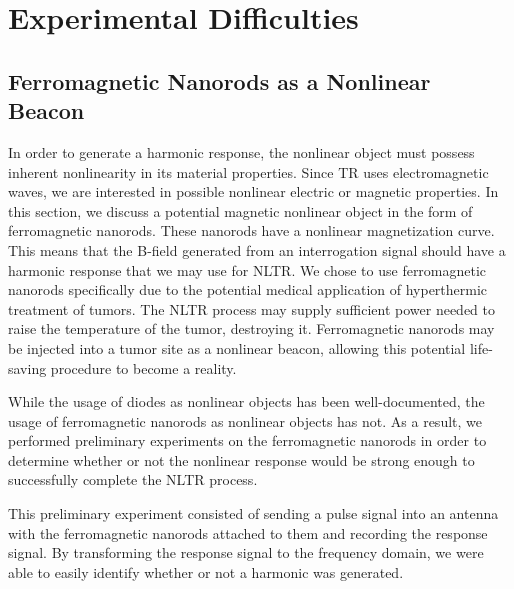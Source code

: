 \section{Experimental Difficulties}
\label{sec:nltr-expr-diff}

\subsection{Ferromagnetic Nanorods as a Nonlinear Beacon}

In order to generate a harmonic response, the nonlinear object must possess inherent nonlinearity in its material properties. Since TR uses electromagnetic waves, we are interested in possible nonlinear electric or magnetic properties. In this section, we discuss a potential magnetic nonlinear object in the form of ferromagnetic nanorods. These nanorods have a nonlinear magnetization curve. This means that the B-field generated from an interrogation signal should have a harmonic response that we may use for NLTR. We chose to use ferromagnetic nanorods specifically due to the potential medical application of hyperthermic treatment of tumors. The NLTR process may supply sufficient power needed to raise the temperature of the tumor, destroying it. Ferromagnetic nanorods may be injected into a tumor site as a nonlinear beacon, allowing this potential life-saving procedure to become a reality.

While the usage of diodes as nonlinear objects has been well-documented, the usage of ferromagnetic nanorods as nonlinear objects has not. As a result, we performed preliminary experiments on the ferromagnetic nanorods in order to determine whether or not the nonlinear response would be strong enough to successfully complete the NLTR process.

This preliminary experiment consisted of sending a pulse signal into an antenna with the ferromagnetic nanorods attached to them and recording the response signal. By transforming the response signal to the frequency domain, we were able to easily identify whether or not a harmonic was generated.

